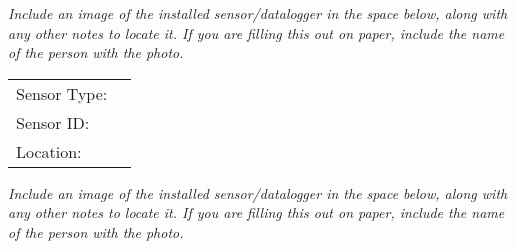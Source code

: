 \documentclass[./main.tex]{subfiles}
\begin{document}
\noindent \emph{Include an image of the installed sensor/datalogger in the space below,  along with any other notes to locate it.  If you are filling this out on paper, include the name of the person with the photo. }

\clearpage

\noindent\begin{tabularx}{\textwidth}{@{}lX@{}}
Sensor Type: & \hrulefill \\[2ex]
Sensor ID: & \hrulefill \\[2ex]
Location: & \hrulefill \\[2ex]
\end{tabularx}

\noindent \emph{Include an image of the installed sensor/datalogger in the space below,  along with any other notes to locate it.  If you are filling this out on paper, include the name of the person with the photo. }



\end{document}
